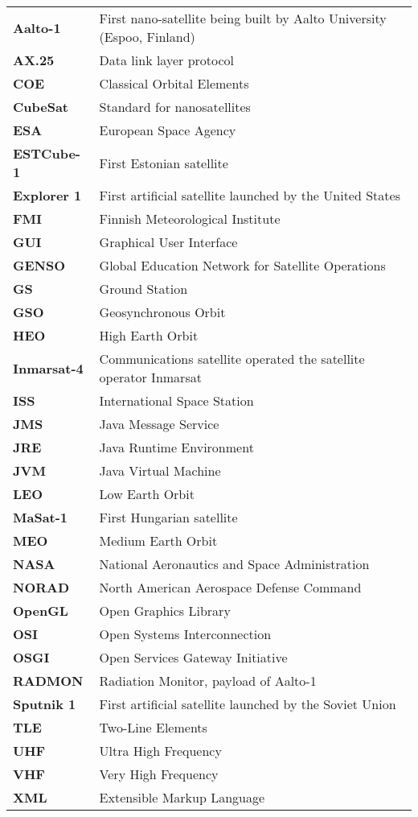 \begin{tabular}{l@{\extracolsep{1.4cm}}l}
\textbf{Aalto-1} & First nano-satellite being built by Aalto University (Espoo, Finland)\\
\textbf{AX.25}   & Data link layer protocol\\
\textbf{COE} 	 & Classical Orbital Elements\\
\textbf{CubeSat} & Standard for nanosatellites\\
\textbf{ESA} & European Space Agency\\
\textbf{ESTCube-1} & First Estonian satellite\\
\textbf{Explorer 1} & First artificial satellite launched by the United States\\
\textbf{FMI} & Finnish Meteorological Institute\\
\textbf{GUI} & Graphical User Interface\\
\textbf{GENSO} & Global Education Network for Satellite Operations\\
\textbf{GS}      & Ground Station\\
\textbf{GSO} &Geosynchronous Orbit\\
\textbf{HEO} &High Earth Orbit\\
\textbf{Inmarsat-4} & Communications satellite operated the satellite operator Inmarsat\\
\textbf{ISS}     & International Space Station\\
\textbf{JMS} &Java Message Service\\
\textbf{JRE} &Java Runtime Environment\\
\textbf{JVM} &Java Virtual Machine\\
\textbf{LEO}     & Low Earth Orbit\\
\textbf{MaSat-1}     & First Hungarian satellite\\
\textbf{MEO}     & Medium Earth Orbit\\
\textbf{NASA}    & National Aeronautics and Space Administration\\
\textbf{NORAD}   & North American Aerospace Defense Command\\
\textbf{OpenGL}  & Open Graphics Library\\ 	
\textbf{OSI}     & Open Systems Interconnection\\
\textbf{OSGI}    & Open Services Gateway Initiative\\
\textbf{RADMON}  & Radiation Monitor, payload of Aalto-1\\
\textbf{Sputnik 1} & First artificial satellite launched by the Soviet Union\\
\textbf{TLE}     & Two-Line Elements\\
\textbf{UHF}     & Ultra High Frequency\\
\textbf{VHF}     & Very High Frequency\\
\textbf{XML} &Extensible Markup Language
\end{tabular}